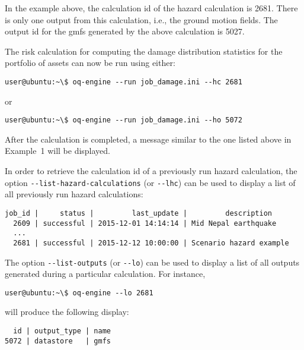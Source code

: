 In the example above, the calculation id of the hazard calculation is 2681.
There is only one output from this calculation, i.e., the ground motion
fields. The output id for the gmfs generated by the above calculation is 5027.

The risk calculation for computing the damage distribution statistics for the
portfolio of assets can now be run using either:

\begin{verbatim}
user@ubuntu:~\$ oq-engine --run job_damage.ini --hc 2681
\end{verbatim}

or

\begin{verbatim}
user@ubuntu:~\$ oq-engine --run job_damage.ini --ho 5072
\end{verbatim}

After the calculation is completed, a message similar to the one listed above
in Example~1 will be displayed.

In order to retrieve the calculation id of a previously run hazard calculation,
the option \Verb+--list-hazard-calculations+ (or \Verb+--lhc+) can be used to
display a list of all previously run hazard calculations:

\begin{verbatim}
job_id |     status |         last_update |         description
  2609 | successful | 2015-12-01 14:14:14 | Mid Nepal earthquake
  ...
  2681 | successful | 2015-12-12 10:00:00 | Scenario hazard example
\end{verbatim}

The option \Verb+--list-outputs+ (or \Verb+--lo+) can be used to display a
list of all outputs generated during a particular calculation. For instance,

\begin{verbatim}
user@ubuntu:~\$ oq-engine --lo 2681
\end{verbatim}

will produce the following display:

\begin{verbatim}
  id | output_type | name
5072 | datastore   | gmfs
\end{verbatim}


